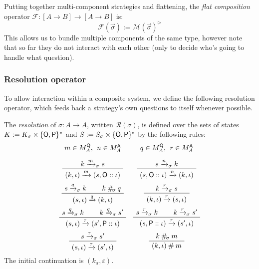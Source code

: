 {Putting together multi-component strategies and flattening,
the \emph{flat composition} operator
$\mathcal{F} : [A \rightarrow B] \rightarrow [A \rightarrow B]$
is:
\[
    \mathcal{F}(\vec{\sigma}) := \mathcal{M}(\vec{\sigma})^\rhd
\]
This allows us to bundle multiple components of the same type,
however note that so far they do not interact with each other
(only to decide who's going to handle what question).


\subsubsection{Resolution operator} %

To allow interaction within a composite system,
we define the following resolution operator,
which feeds back a strategy's own questions to itself
whenever possible.

\begin{definition} %
The \emph{resolution} of $\sigma : A \rightarrow A$,
written $\mathcal{R}(\sigma)$,
is defined over the sets of states
$K := K_\sigma \times \{ \mathsf{O} ,  \mathsf{P} \}^*$ and
$S := S_\sigma \times \{ \mathsf{O} ,  \mathsf{P} \}^*$
by the following rules:
\[
  \begin{array}{cc}
    {\small m \in M_A^\kw{Q}, \:\: n \in M_A^\kw{A}}
    &
    {\small q \in M_A^\kw{Q}, \:\: r \in M_A^\kw{A}}
    \\[1em]
    \AxiomC{$k \xrightarrow{m}_\sigma s$}
    \UnaryInfC{$(k, \iota) \xrightarrow{m} (s, \kw{O} :: \iota)$}
    \DisplayProof
    &
    \AxiomC{$s \xrightarrow{n}_\sigma k$}
    \UnaryInfC{$(s, \kw{O} :: \iota) \xrightarrow{n} (k, \iota)$}
    \DisplayProof
    \\[1.5em]
    \AxiomC{$s \xrightarrow{q}_\sigma k$}
    \AxiomC{$k \:\#_{\!\sigma}\: q$}
    \BinaryInfC{$(s, \iota) \xrightarrow{q} (k, \iota)$}
    \DisplayProof
    &
    \AxiomC{$k \xrightarrow{r}_\sigma s$}
    \UnaryInfC{$(k, \iota) \xrightarrow{r} (s, \iota)$}
    \DisplayProof
    \\[1.5em]
    \AxiomC{$s \xrightarrow{q}_\sigma k$}
    \AxiomC{$k \xrightarrow{q}_\sigma s'$}
    \BinaryInfC{$(s, \iota) \xrightarrow{\tau} (s', \kw{P} :: \iota)$}
    \DisplayProof
    &
    \AxiomC{$s \xrightarrow{r}_\sigma k$}
    \AxiomC{$k \xrightarrow{r}_\sigma s'$}
    \BinaryInfC{$(s, \kw{P} :: \iota) \xrightarrow{\tau} (s', \iota)$}
    \DisplayProof
    \\[1.5em]
    \AxiomC{$s \xrightarrow{\tau}_\sigma s'$}
    \UnaryInfC{$(s, \iota) \xrightarrow{\tau} (s', \iota)$}
    \DisplayProof
    &
    \AxiomC{$k \:\#_{\!\sigma}\: m$}
    \UnaryInfC{$(k, \iota) \:\#\: m$}
    \DisplayProof
  \end{array}
\]
The initial continuation is $(k_{\sigma}, \varepsilon)$.
\end{definition}

}
